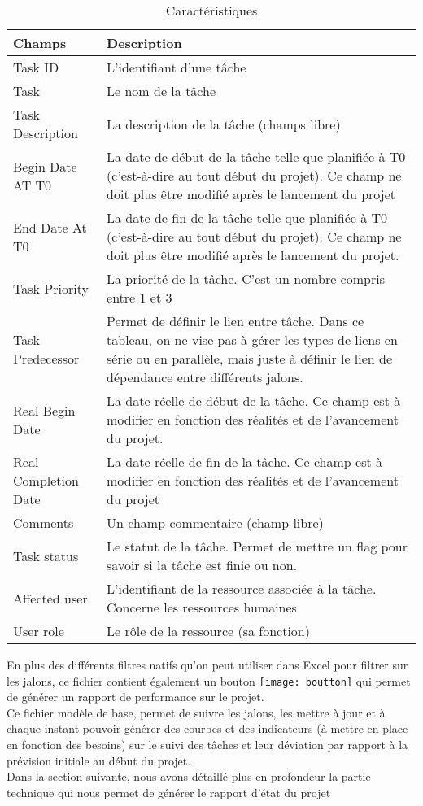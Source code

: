 \begin{table}[h]
\centering
\begin{tabular}{|p{5cm}|m{10cm}|}
\hline Champs & Description \tabularnewline
\hline Task ID & L'identifiant d'une tâche \tabularnewline
\hline Task & Le nom de la tâche \tabularnewline
\hline Task Description & La description de la tâche (champs libre) \tabularnewline
\hline Begin Date AT T0 & La date de début de la tâche telle que planifiée à T0 (c'est-à-dire au tout début du projet). Ce champ ne doit plus être modifié après le lancement du projet \tabularnewline
\hline End Date At T0 & La date de fin de la tâche telle que planifiée à T0 (c'est-à-dire au tout début du projet). Ce champ ne doit plus être modifié après le lancement du projet. \tabularnewline
\hline Task Priority & La priorité de la tâche. C'est un nombre compris entre 1 et 3 \tabularnewline
\hline Task Predecessor & Permet de définir le lien entre tâche. Dans ce tableau, on ne vise pas à gérer les types de liens en série ou en parallèle, mais juste à définir le lien de dépendance entre différents jalons. \tabularnewline
\hline Real Begin Date & La date réelle de début de la tâche. Ce champ est à modifier en fonction des réalités et de l'avancement du projet.  \tabularnewline
\hline Real Completion Date & La date réelle de fin de la tâche. Ce champ est à modifier en fonction des réalités et de l'avancement du projet \tabularnewline
\hline Comments & Un champ commentaire (champ libre) \tabularnewline
\hline Task status & Le statut de la tâche. Permet de mettre un flag pour savoir si la tâche est finie ou non. \tabularnewline
\hline Affected user & L'identifiant de la ressource associée à la tâche. Concerne les ressources humaines \tabularnewline
\hline User role & Le rôle de la ressource (sa fonction) \tabularnewline
\hline
\end{tabular}
\caption{\label{bloc2}Caractéristiques}
\end{table}
\clearpage
En plus des différents filtres natifs qu'on peut utiliser dans Excel pour filtrer sur les jalons, ce fichier contient également un bouton \texttt{[image: boutton]} qui permet de générer un rapport de performance sur le projet.\\
Ce fichier modèle de base, permet de suivre les jalons, les mettre à jour et à chaque instant pouvoir générer des courbes et des indicateurs (à mettre en place en fonction des besoins) sur le suivi des tâches et leur déviation par rapport à la prévision initiale au début du projet.\\
Dans la section suivante, nous avons détaillé plus en profondeur la partie technique qui nous permet de générer le rapport d'état du projet
